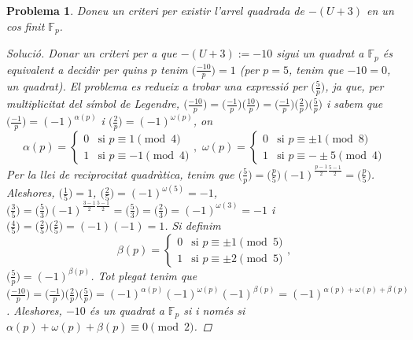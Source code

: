 \documentclass[compress]{article}
\newtheorem{problema}{Problema}
\theoremstyle{definition}
\begin{document}
\begin{problema}
    Doneu un criteri per existir l'arrel quadrada de $-(U+3)$ en un cos finit $\mathbb{F}_{p}$.
    \begin{proof}[Solució]
        Donar un criteri per a que $-(U+3):=-10$ sigui un quadrat a $\mathbb{F}_{p}$ és equivalent a decidir per quins $p$ tenim $\big(\frac{-10}{p}\big)=1$ (per $p=5$, tenim que $-10=0$, un quadrat). El problema es redueix a trobar una expressió per $\big(\frac{5}{p}\big)$, ja que, per multiplicitat del símbol de Legendre, $\big(\frac{-10}{p}\big)
        =\big(\frac{-1}{p}\big)
        \big(\frac{10}{p}\big)
        =\big(\frac{-1}{p}\big)
        \big(\frac{2}{p}\big)
        \big(\frac{5}{p}\big)$ i sabem que $\big(\frac{-1}{p}\big)=(-1)^{\alpha(p)}$ i $\big(\frac{2}{p}\big)=(-1)^{\omega(p)}$, on
        \begin{equation*}
            \alpha(p)
            =\begin{cases}
                0&\textrm{si }p\equiv1\pmod{4}\\
                1&\textrm{si }p\equiv-1\pmod{4}
            \end{cases},\,\,
            \omega(p)
            =\begin{cases}
                0&\textrm{si }p\equiv\pm1\pmod{8}\\
                1&\textrm{si }p\equiv-\pm5\pmod{4}
            \end{cases}
        \end{equation*}
        Per la llei de reciprocitat quadràtica, tenim que $\big(\frac{5}{p}\big)
        =\big(\frac{p}{5}\big)(-1)^{\frac{p-1}{2}\frac{5-1}{2}}
        =\big(\frac{p}{5}\big)$. Aleshores, $(\frac{1}{5}\big)=1$, $(\frac{2}{5}\big)=(-1)^{\omega(5)}=-1$, $(\frac{3}{5}\big)=(\frac{5}{3}\big)(-1)^{\frac{3-1}{2}\frac{5-1}{2}}=(\frac{5}{3}\big)=(\frac{2}{3}\big)=(-1)^{\omega(3)}=-1$ i $(\frac{4}{5}\big)=(\frac{2}{5}\big)(\frac{2}{5}\big)=(-1)(-1)=1$. Si definim
        \begin{equation*}
            \beta(p)
            =\begin{cases}
                0&\textrm{si }p\equiv\pm1\pmod{5}\\
                1&\textrm{si }p\equiv\pm2\pmod{5}
            \end{cases},
        \end{equation*}
        $\big(\frac{5}{p}\big)=(-1)^{\beta(p)}$. Tot plegat tenim que $\big(\frac{-10}{p}\big)
        =\big(\frac{-1}{p}\big)
        \big(\frac{2}{p}\big)
        \big(\frac{5}{p}\big)
        =(-1)^{\alpha(p)}(-1)^{\omega(p)}(-1)^{\beta(p)}=(-1)^{\alpha(p)+\omega(p)+\beta(p)}$. Aleshores, $-10$ és un quadrat a $\mathbb{F}_{p}$ si i només si $\alpha(p)+\omega(p)+\beta(p)\equiv0\pmod{2}$.
    \end{proof}
\end{problema}
\end{document}

